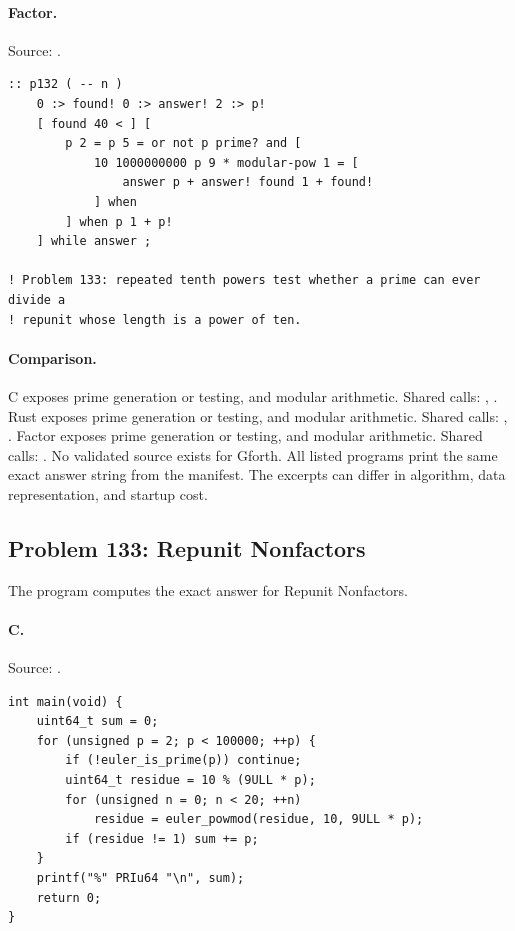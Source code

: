 \paragraph{Factor.} Source: .
\begin{lstlisting}
:: p132 ( -- n )
    0 :> found! 0 :> answer! 2 :> p!
    [ found 40 < ] [
        p 2 = p 5 = or not p prime? and [
            10 1000000000 p 9 * modular-pow 1 = [
                answer p + answer! found 1 + found!
            ] when
        ] when p 1 + p!
    ] while answer ;

! Problem 133: repeated tenth powers test whether a prime can ever divide a
! repunit whose length is a power of ten.
\end{lstlisting}

\paragraph{Comparison.}
C exposes prime generation or testing, and modular arithmetic. Shared calls: \texttt{}, \texttt{}. Rust exposes prime generation or testing, and modular arithmetic. Shared calls: \texttt{}, \texttt{}. Factor exposes prime generation or testing, and modular arithmetic. Shared calls: \texttt{}.
No validated source exists for Gforth.
All listed programs print the same exact answer string from the manifest. The excerpts can differ in algorithm, data representation, and startup cost.

\subsection{Problem 133: Repunit Nonfactors}
\label{walkthrough:p133}
The program computes the exact answer for Repunit Nonfactors.

\paragraph{C.} Source: .
\begin{lstlisting}
int main(void) {
    uint64_t sum = 0;
    for (unsigned p = 2; p < 100000; ++p) {
        if (!euler_is_prime(p)) continue;
        uint64_t residue = 10 % (9ULL * p);
        for (unsigned n = 0; n < 20; ++n)
            residue = euler_powmod(residue, 10, 9ULL * p);
        if (residue != 1) sum += p;
    }
    printf("%" PRIu64 "\n", sum);
    return 0;
}
\end{lstlisting}

